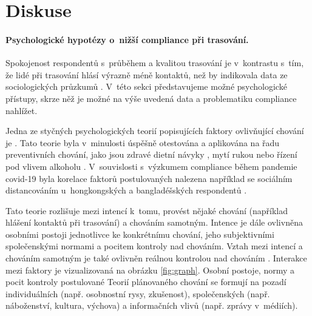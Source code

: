 \vspace{-0.6eM}

\section*{Diskuse}

\vspace{-0.3eM}

\paragraph*{Psychologické hypotézy o~nižší compliance při trasování.}
Spokojenost res\-pon\-den\-tů  s~průběhem a kvalitou trasování je v~kontrastu s~tím, že lidé při trasování hlásí výrazně méně kontaktů, než by indikovala data ze sociologických průzkumů \cite{Prokop2020a}. V~této sekci představujeme možné psychologické přístupy, skrze něž je možné na výše uvedená data a problematiku compliance nahlížet.  

Jedna ze styčných psychologických teorií popisujících faktory ovlivňující chování je  \cite{Ajzen1985}. Tato teorie byla v~minulosti úspěšně otestována a aplikována na řadu preventivních chování, jako jsou zdravé dietní návyky \cite{Hackman2014}, mytí rukou \cite{Hackman2014} nebo řízení pod vlivem alkoholu \cite{Moan2011}. V~souvislosti s~výzkumem compliance během pandemie covid-19 byla korelace faktorů postulovaných  nalezena například se sociálním distancováním u~hongkongských \cite{Yu2021} a bangladéšských respondentů \cite{Das2021}. 

Tato teorie rozlišuje mezi intencí k~tomu, provést nějaké chování (například hlášení kontaktů při trasování) a chováním samotným. Intence je dále ovlivněna osobními postoji jednotlivce ke konkrétnímu chování, jeho subjektivními spo\-le\-čen\-ský\-mi normami a pocitem kontroly nad chováním. 
Vztah mezi intencí a chováním samotným je také ovlivněn reálnou kontrolou nad chováním \cite{Ajzen1985}. Interakce mezi faktory je vizualizovaná na obrázku \ref{fig:graph}. Osobní postoje, normy a pocit kontroly postulované Teorií plánovaného chování se formují na pozadí individuálních (např. osobnostní rysy, zkušenost), společenských (např. náboženství, kultura, vý\-cho\-va) a informačních vlivů (např. zprávy v~médiích). 


